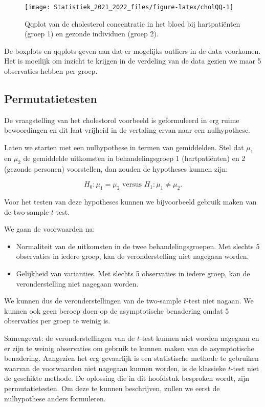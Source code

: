 \documentclass[
  12pt,dutch,coursenotes]{book}
\providecommand{\tightlist}{%
  \setlength{\itemsep}{0pt}\setlength{\parskip}{0pt}}
\theoremstyle{definition}
\theoremstyle{definition}
\theoremstyle{definition}
\theoremstyle{definition}
\theoremstyle{remark}
\begin{document}
\begin{figure}

{\centering \texttt{[image: Statistiek\_2021\_2022\_files/figure-latex/cholQQ-1]} 

}

\caption{Qqplot van de cholesterol concentratie in het bloed bij hartpatiënten (groep 1) en gezonde individuen (groep 2).}\label{fig:cholQQ}
\end{figure}

De boxplots en qqplots geven aan dat er mogelijks outliers in de data voorkomen.
Het is moeilijk om inzicht te krijgen in de verdeling van de data gezien we maar 5 observaties hebben per groep.

\hypertarget{permutatietesten}{%
\subsection{Permutatietesten}\label{permutatietesten}}

De vraagstelling van het cholestorol voorbeeld is geformuleerd in erg ruime bewoordingen en dit laat vrijheid in de vertaling ervan naar een nulhypothese.

Laten we starten met een nulhypothese in termen van gemiddelden. Stel dat \(\mu_1\) en \(\mu_2\) de gemiddelde uitkomsten in behandelingsgroep 1 (hartpatiënten) en 2 (gezonde personen) voorstellen, dan zouden de hypotheses kunnen zijn:

\[H_0: \mu_1=\mu_2 \text{ versus } H_1: \mu_1\neq \mu_2.\]

Voor het testen van deze hypotheses kunnen we bijvoorbeeld gebruik maken van de two-sample \(t\)-test.

We gaan de voorwaarden na:

\begin{itemize}
\tightlist
\item
  Normaliteit van de uitkomsten in de twee behandelingsgroepen. Met slechts 5 observaties in iedere groep, kan de veronderstelling niet nagegaan worden.
\item
  Gelijkheid van varianties. Met slechts 5 observaties in iedere groep, kan de veronderstelling niet nagegaan worden.
\end{itemize}

We kunnen dus de veronderstellingen van de two-sample \(t\)-test niet nagaan.
We kunnen ook geen beroep doen op de asymptotische benadering omdat 5 observaties per groep te weinig is.

Samengevat: de veronderstellingen van de \(t\)-test kunnen niet worden nagegaan en er zijn te weinig observaties om gebruik te kunnen maken van de asymptotische benadering. Aangezien het erg gevaarlijk is een statistische methode te gebruiken waarvan de voorwaarden niet nagegaan kunnen worden, is de klassieke \(t\)-test niet de geschikte methode. De oplossing die in dit hoofdstuk besproken wordt, zijn permutatietesten.
Om deze te kunnen beschrijven, zullen we eerst de nulhypothese anders formuleren.
\end{document}
